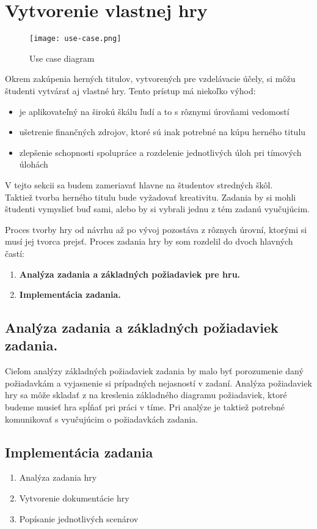 \section{Vytvorenie vlastnej hry}\label{vytvorenie-vlastnej-hry}

\begin{figure}
	\texttt{[image: use-case.png]}
	\caption{Use case diagram}
	\label{use-case-tvorba-hry}
\end{figure}


Okrem zakúpenia herných titulov, vytvorených pre vzdelávacie účely, si môžu študenti vytvárať aj vlastné hry.
Tento prístup má niekoľko výhod: 
	\begin{itemize}
		\item je aplikovateľný na širokú škálu ľudí a to s rôznymi úrovňami vedomostí
		\item ušetrenie finančných zdrojov, ktoré sú inak potrebné na kúpu herného titulu
		\item zlepšenie schopnosti spolupráce a rozdelenie jednotlivých úloh pri tímových úlohách 
	\end{itemize}

V tejto sekcii sa budem zameriavať hlavne na študentov stredných škôl.\\

Taktiež tvorba herného titulu bude vyžadovať kreativitu.
Zadania by si mohli študenti vymyslieť buď sami, alebo by si vybrali jednu z tém zadanú vyučujúcim.

Proces tvorby hry od návrhu až po vývoj pozostáva z rôznych úrovní, ktorými si musí jej tvorca prejsť.
Proces zadania hry by som rozdelil do dvoch hlavných častí:
	\begin{enumerate}
		\item \textbf{Analýza zadania a základných požiadaviek pre hru.}
		\item \textbf{Implementácia zadania.}
	\end{enumerate}


	\subsection{Analýza zadania a základných požiadaviek zadania.}\label{analyza-zadania}
	Cieľom analýzy základných požiadaviek zadania by malo byť porozumenie 
	daný požiadavkám a vyjasnenie si prípadných nejasností v zadaní. Analýza požiadaviek 
	hry sa môže skladať z na kreslenia základného diagramu požiadaviek,
	ktoré budeme musieť hra spĺňať pri práci v tíme. Pri analýze je taktiež potrebné komunikovať 
	s vyučujúcim o požiadavkách zadania. 


	\subsection{Implementácia zadania}\label{implementacia-zadania}
	\begin{enumerate}
		\item Analýza zadania hry
		\item Vytvorenie dokumentácie hry
		\item Popísanie jednotlivých scenárov
	\end{enumerate}
